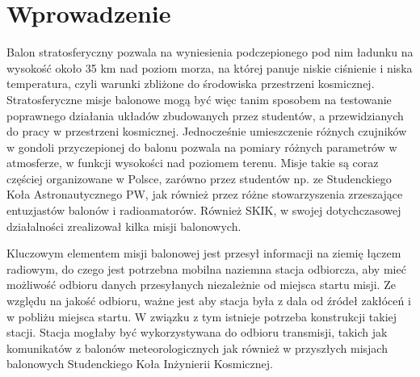 \section{Wprowadzenie}


Balon stratosferyczny pozwala na wyniesienia podczepionego pod nim ładunku na wysokość około 35 km nad poziom morza, na której panuje niskie ciśnienie i niska temperatura, czyli warunki zbliżone do środowiska przestrzeni kosmicznej. Stratosferyczne misje balonowe mogą być więc tanim sposobem na testowanie poprawnego działania układów zbudowanych przez studentów, a przewidzianych do pracy w przestrzeni kosmicznej. Jednocześnie umieszczenie różnych czujników w gondoli przyczepionej do balonu pozwala na pomiary różnych parametrów w atmosferze, w funkcji wysokości nad poziomem terenu. Misje takie są coraz częściej organizowane w Polsce, zarówno przez studentów np. ze Studenckiego Koła Astronautycznego PW, jak  również przez różne stowarzyszenia zrzeszające entuzjastów balonów i radioamatorów. Również SKIK, w swojej dotychczasowej działalności zrealizował kilka misji balonowych.

Kluczowym elementem misji balonowej jest przesył informacji na ziemię łączem radiowym, do czego jest potrzebna mobilna naziemna stacja odbiorcza, aby mieć możliwość odbioru danych przesyłanych niezależnie od miejsca startu misji. Ze względu na jakość odbioru, ważne jest aby stacja była z dala od źródeł zakłóceń i w pobliżu miejsca startu. W związku z tym istnieje potrzeba konstrukcji takiej stacji. Stacja mogłaby być wykorzystywana do odbioru transmisji, takich jak komunikatów z balonów meteorologicznych jak również w przyszłych misjach balonowych Studenckiego Koła Inżynierii Kosmicznej.
